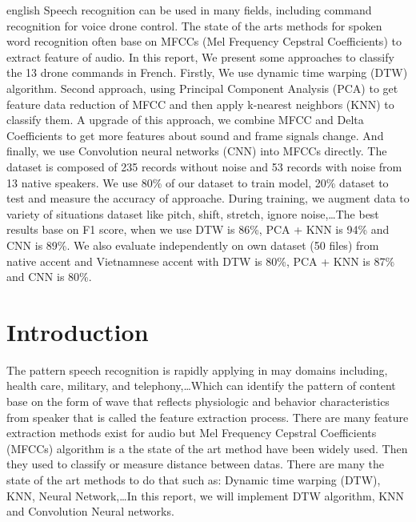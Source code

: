 \documentclass[%
  article,%
  10pt,%
  a4paper,%
  fleqn,%
  oneside,%
  sumario = tradicional,%
  chapter = TITLE,%
  section = TITLE,%
]{abntex2}
\author{
  21906085\\
  Duc Thang, NGUYEN\\
  \texttt{duc-thang.nguyen@univ-tlse3.fr}
  \and
   21902771\\
  Clement, POULL\\
  \texttt{clement.poull@univ-tlse3.fr}
}
\begin{document}
\pretextual%

\begin{paginadetitulo}%

\begin{ambienteresumo}[Abstract]%
\begin{otherlanguage*}{english}%
Speech recognition can be used in many fields, including command recognition for voice drone control. The state of the arts methods for spoken word recognition often base on MFCCs (Mel Frequency Cepstral Coefficients) to extract feature of audio. In this report, We present some approaches to classify the 13 drone commands in French. Firstly, We use dynamic time warping (DTW) algorithm. Second approach, using Principal Component Analysis (PCA) to get feature data reduction of MFCC and then apply k-nearest neighbors (KNN) to classify them. A upgrade of this approach, we combine MFCC and Delta Coefficients to get more features about sound and frame signals change. And finally, we use Convolution neural networks (CNN) into MFCCs directly. The dataset is composed of  235 records without noise and 53 records with noise from 13 native speakers. We use 80\% of our dataset to train model, 20\% dataset to test and measure the accuracy of approache. During training, we augment data to variety of situations dataset like pitch, shift, stretch, ignore noise,\dots The best results base on F1 score, when we use DTW is 86\%, PCA + KNN is 94\% and CNN is 89\%. We also evaluate independently on own dataset (50 files) from native accent and Vietnamnese accent with DTW is 80\%, PCA + KNN is 87\% and CNN is 80\%.
\end{otherlanguage*}
\end{ambienteresumo}

\end{paginadetitulo}

\textual%

\section{Introduction}\label{sec:intro}

The pattern speech recognition is rapidly applying in may domains including, health care, military, and telephony,\dots Which can identify the pattern of content base on the form of wave that reflects physiologic and behavior characteristics from speaker that is called the feature extraction process. There are many feature extraction methods exist for audio but Mel Frequency Cepstral Coefficients (MFCCs) algorithm is a the state of the art method have been widely used. Then they used to classify or measure distance between datas. There are many the state of the art methods to do that such as: Dynamic time warping (DTW), KNN, Neural Network,\dots In this report, we will implement DTW algorithm, KNN and Convolution Neural networks.
\end{document}
